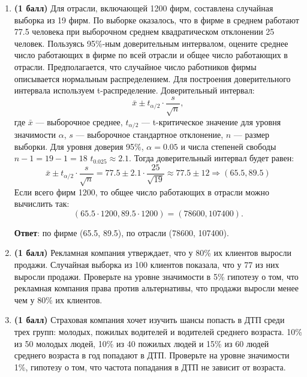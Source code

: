 \documentclass{assignment}
\begin{document}
\begin{enumerate}
    \item \textbf{(1 балл)} Для отрасли, включающей 1200 фирм, составлена случайная выборка из 19 фирм. По выборке оказалось, что в фирме в среднем работают 77.5 человека при выборочном среднем квадратическом отклонении 25 человек. Пользуясь 95\%-ным доверительным интервалом, оцените среднее число работающих в фирме по всей отрасли и общее число работающих в отрасли. Предполагается, что случайное число работников фирмы описывается нормальным распределением.
    \start
    Для построения доверительного интервала используем t-распределение. Доверительный интервал:
    \begin{equation}
        \bar{x} \pm t_{\alpha/2}\cdot \frac{s}{\sqrt{n}},
    \end{equation}
    где $\bar{x}$ — выборочное среднее, $t_{\alpha/2}$ — t-критическое значение для уровня значимости $\alpha$, $s$ — выборочное стандартное отклонение, $n$ — размер выборки. Для уровня доверия 95\%, $\alpha = 0.05$ и числа степеней свободы $n-1 = 19-1 = 18$ $t_0.025 \approx 2.1$. Тогда доверительный интервал будет равен:
    \begin{equation}
        \bar{x} \pm t_{\alpha/2}\cdot \frac{s}{\sqrt{n}} = 77.5 \pm 2.1\cdot \frac{25}{\sqrt{19}} \approx 77.5 \pm 12 \Rightarrow (65.5, 89.5)
    \end{equation}
    Если всего фирм 1200, то общее число работающих в отрасли можно вычислить так:
    \begin{equation}
        (65.5\cdot 1200, 89.5\cdot 1200) = (78600, 107400).
    \end{equation}

    \textbf{Ответ}: по фирме (65.5, 89.5), по отрасли (78600, 107400).
    \finish

    \item \textbf{(1 балл)} Рекламная компания утверждает, что у 80\% их клиентов выросли продажи. Случайная выборка из 100 клиентов показала, что у 77 из них выросли продажи. Проверьте на уровне значимости в 5\% гипотезу о том, что рекламная компания права против альтернативы, что продажи выросли менее чем у 80\% их клиентов.

    \item \textbf{(1 балл)} Страховая компания хочет изучить шансы попасть в ДТП среди трех групп: молодых, пожилых водителей и водителей среднего возраста. 10\% из 50 молодых людей, 10\% из 40 пожилых людей и 15\% из 60 людей среднего возраста в год попадают в ДТП. Проверьте на уровне значимости 1\%, гипотезу о том, что частота попадания в ДТП не зависит от возраста.


\end{enumerate}
\end{document}
